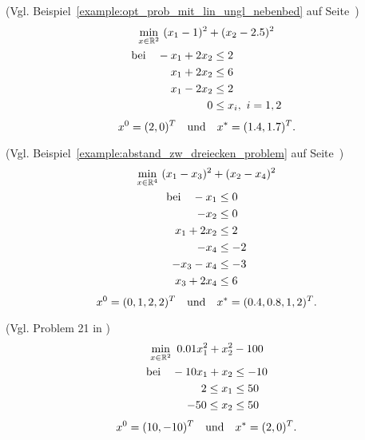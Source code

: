 \begin{testproblem}
(Vgl. Beispiel~\ref{example:opt_prob_mit_lin_ungl_nebenbed} auf Seite~\pageref{example:opt_prob_mit_lin_ungl_nebenbed})
\begin{gather}
\min_{x\in\mathbb{R}^2}\ (x_1 - 1)^2 + (x_2 - 2.5)^2 \notag \\
\begin{split}
\text{bei}\quad -x_1 + 2 x_2 & \leq 2 \\
x_1 + 2 x_2 & \leq 6 \\
x_1 - 2 x_2 & \leq 2 \\
0 & \leq x_i,\ i = 1,2 \\
\end{split}
\end{gather}
\begin{equation*}
x^0 = (2, 0)^T \quad\text{und}\quad x^* = (1.4, 1.7)^T.
\end{equation*}
\end{testproblem}

\begin{testproblem}
(Vgl. Beispiel~\ref{example:abstand_zw_dreiecken_problem} auf Seite~\pageref{example:abstand_zw_dreiecken_problem})
\begin{gather}
\min_{x\in\mathbb{R}^4}\ (x_1 - x_3)^2 + (x_2 - x_4)^2 \notag \\
\begin{split}
\text{bei}\quad -x_1 & \leq 0 \\
-x_2 & \leq 0 \\
x_1 + 2 x_2 & \leq 2 \\
-x_4 & \leq -2 \\
-x_3 - x_4 & \leq -3 \\
x_3 + 2 x_4 & \leq 6 \\
\end{split}
\end{gather}
\begin{equation*}
x^0 = (0, 1, 2, 2)^T \quad\text{und}\quad x^* = (0.4, 0.8, 1, 2)^T.
\end{equation*}
\end{testproblem}

\begin{testproblem}
(Vgl. Problem 21 in \cite[S.~44]{hock})
\begin{gather}
\min_{x\in\mathbb{R}^2}\ 0.01 x_1^2 + x_2^2 - 100 \notag \\
\begin{split}
\text{bei}\quad -10 x_1 + x_2 & \leq -10 \\
2 \leq x_1 & \leq 50 \\
-50 \leq x_2 & \leq 50 \\
\end{split}
\end{gather}
\begin{equation*}
x^0 = (10, -10)^T \quad\text{und}\quad x^* = (2, 0)^T.
\end{equation*}
\end{testproblem}

